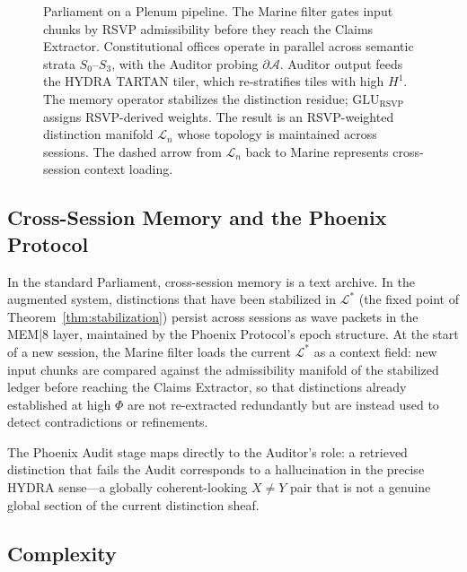 \documentclass[12pt, a4paper]{article}
\theoremstyle{plain}
\theoremstyle{definition}
\theoremstyle{remark}
\begin{document}
\begin{figure}[h]
\begin{tikzpicture}
\end{tikzpicture}
\caption{Parliament on a Plenum pipeline. The Marine filter gates input chunks by RSVP admissibility before they reach the Claims Extractor. Constitutional offices operate in parallel across semantic strata $S_0$--$S_3$, with the Auditor probing $\partial\mathcal{A}$. Auditor output feeds the HYDRA TARTAN tiler, which re-stratifies tiles with high $H^1$. The memory operator stabilizes the distinction residue; $\mathrm{GLU}_\mathrm{RSVP}$ assigns RSVP-derived weights. The result is an RSVP-weighted distinction manifold $\mathcal{L}_n$ whose topology is maintained across sessions. The dashed arrow from $\mathcal{L}_n$ back to Marine represents cross-session context loading.}
\label{fig:pipeline}
\end{figure}

\subsection{Cross-Session Memory and the Phoenix Protocol}

In the standard Parliament, cross-session memory is a text archive. In the augmented system, distinctions that have been stabilized in $\mathcal{L}^*$ (the fixed point of Theorem~\ref{thm:stabilization}) persist across sessions as wave packets in the MEM|8 layer, maintained by the Phoenix Protocol's epoch structure. At the start of a new session, the Marine filter loads the current $\mathcal{L}^*$ as a context field: new input chunks are compared against the admissibility manifold of the stabilized ledger before reaching the Claims Extractor, so that distinctions already established at high $\Phi$ are not re-extracted redundantly but are instead used to detect contradictions or refinements.

The Phoenix Audit stage maps directly to the Auditor's role: a retrieved distinction that fails the Audit corresponds to a hallucination in the precise HYDRA sense---a globally coherent-looking $X \neq Y$ pair that is not a genuine global section of the current distinction sheaf.

\subsection{Complexity}
\end{document}
